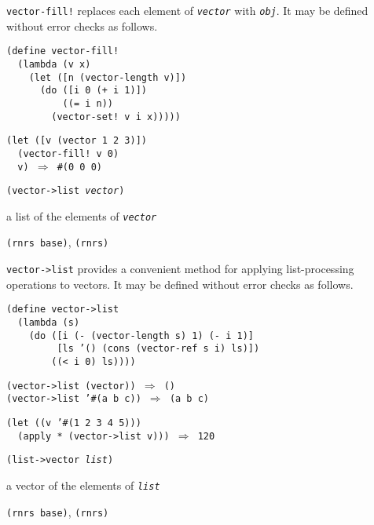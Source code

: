 \texttt{vector-fill!} replaces each element of \texttt{\textit{vector}} with \texttt{\textit{obj}}.
It may be defined without error checks as follows.

\begin{alltt}
(define vector-fill!
  (lambda (v x)
    (let ([n (vector-length v)])
      (do ([i 0 (+ i 1)])
          ((= i n))
        (vector-set! v i x)))))

(let ([v (vector 1 2 3)])
  (vector-fill! v 0)
  v) \(\Rightarrow\) \#{}(0 0 0)
\end{alltt}

\begin{description}

\label{objects_s237}\item[procedure] \texttt{(vector-\textgreater{}list \textit{vector})}



\item[returns] a list of the elements of \texttt{\textit{vector}}


\item[libraries] \texttt{(rnrs base)}, \texttt{(rnrs)}
\end{description}

\texttt{vector-\textgreater{}list} provides a convenient method for applying list-processing
operations to vectors.
It may be defined without error checks as follows.

\begin{alltt}
(define vector-\textgreater{}list
  (lambda (s)
    (do ([i (- (vector-length s) 1) (- i 1)]
         [ls '() (cons (vector-ref s i) ls)])
        ((\textless{} i 0) ls))))

(vector-\textgreater{}list (vector)) \(\Rightarrow\) ()
(vector-\textgreater{}list '\#{}(a b c)) \(\Rightarrow\) (a b c)

(let ((v '\#{}(1 2 3 4 5)))
  (apply * (vector-\textgreater{}list v))) \(\Rightarrow\) 120
\end{alltt}

\begin{description}

\label{objects_s238}\item[procedure] \texttt{(list-\textgreater{}vector \textit{list})}



\item[returns] a vector of the elements of \texttt{\textit{list}}


\item[libraries] \texttt{(rnrs base)}, \texttt{(rnrs)}
\end{description}

